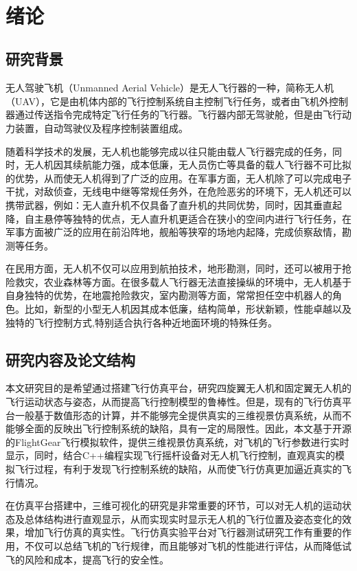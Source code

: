 
﻿\chapter{绪论}\label{preface}

\section{研究背景}
无人驾驶飞机（Unmanned Aerial Vehicle）是无人飞行器的一种，简称无人机（UAV），它是由机体内部的飞行控制系统自主控制飞行任务，或者由飞机外控制器通过传送指令完成特定飞行任务的飞行器。飞行器内部无驾驶舱，但是由飞行动力装置，自动驾驶仪及程序控制装置组成。

随着科学技术的发展，无人机也能够完成以往只能由载人飞行器完成的任务，同时，无人机因其续航能力强，成本低廉，无人员伤亡等具备的载人飞行器不可比拟的优势，从而使无人机得到了广泛的应用。在军事方面，无人机除了可以完成电子干扰，对敌侦查，无线电中继等常规任务外，在危险恶劣的环境下，无人机还可以携带武器，例如：无人直升机不仅具备了直升机的共同优势，同时，因其垂直起降，自主悬停等独特的优点，无人直升机更适合在狭小的空间内进行飞行任务，在军事方面被广泛的应用在前沿阵地，舰船等狭窄的场地内起降，完成侦察敌情，勘测等任务\cite{yuyanping2010}。

在民用方面，无人机不仅可以应用到航拍技术，地形勘测，同时，还可以被用于抢险救灾，农业森林等方面。在很多载人飞行器无法直接操纵的环境中，无人机基于自身独特的优势，在地震抢险救灾，室内勘测等方面，常常担任空中机器人的角色。比如，新型的小型无人机因其成本低廉，结构简单，形状新颖，性能卓越以及独特的飞行控制方式\cite{liupeng2011},特别适合执行各种近地面环境的特殊任务。

\section{研究内容及论文结构}
本文研究目的是希望通过搭建飞行仿真平台，研究四旋翼无人机和固定翼无人机的飞行运动状态与姿态，从而提高飞行控制模型的鲁棒性。但是，现有的飞行仿真平台一般基于数值形态的计算，并不能够完全提供真实的三维视景仿真系统，从而不能够全面的反映出飞行控制系统的缺陷，具有一定的局限性。因此，本文基于开源的FlightGear飞行模拟软件，提供三维视景仿真系统，对飞机的飞行参数进行实时显示，同时，结合C++编程实现飞行摇杆设备对无人机飞行控制，直观真实的模拟飞行过程，有利于发现飞行控制系统的缺陷，从而使飞行仿真更加逼近真实的飞行情况。

在仿真平台搭建中，三维可视化的研究是非常重要的环节，可以对无人机的运动状态及总体结构进行直观显示\cite{lihaiquan2011}，从而实现实时显示无人机的飞行位置及姿态变化的效果，增加飞行仿真的真实性。飞行仿真实验平台对飞行器测试研究工作有重要的作用，不仅可以总结飞机的飞行规律，而且能够对飞机的性能进行评估，从而降低试飞的风险和成本，提高飞行的安全性。

